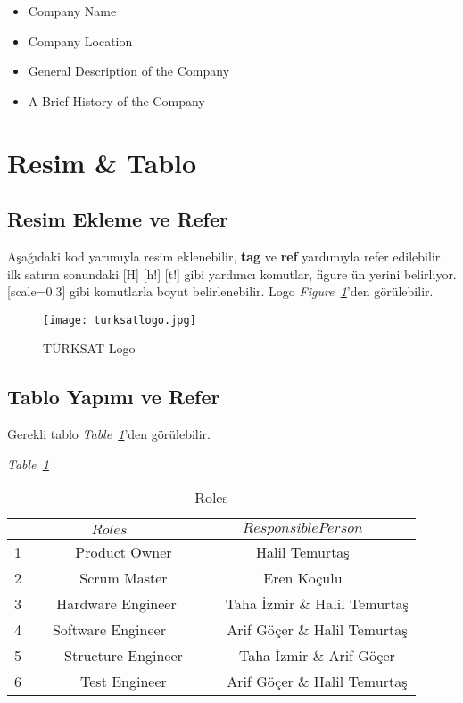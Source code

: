\begin{itemize}
\item Company Name
\item Company Location
\item General Description of the Company
\item A Brief History of the Company
\end{itemize}

\section{Resim \& Tablo}

\subsection{Resim Ekleme ve Refer}
\-
\indent
Aşağıdaki kod yarımıyla resim eklenebilir, \textbf{tag} ve \textbf{ref} yardımıyla refer edilebilir. ilk satırın sonundaki [H] [h!] [t!] gibi yardımcı komutlar, figure ün yerini belirliyor. [scale=0.3] gibi komutlarla boyut belirlenebilir. Logo \textit{Figure~\ref{fig:logo}}'den görülebilir.


\begin{figure}[H]
\centering
\texttt{[image: turksatlogo.jpg]}\\
\caption{\label{fig:logo} TÜRKSAT Logo }
\end{figure}

\subsection{Tablo Yapımı ve Refer}
\- \indent
	Gerekli tablo \textit{Table~\ref{tab:roles}}'den görülebilir.

\textit{Table~\ref{tab:roles}}

\begin{table}[h!]
  \centering
 
    \begin{tabular}{c|c|c}
       &$$Roles$$ & $$Responsible Person$$ \\ \hline
       1 & ~~~~Product Owner & Halil Temurtaş  \\ \hline
       2 & ~~~~Scrum Master  & Eren Koçulu  \\ \hline
       3 & ~~Hardware Engineer & ~~~~Taha İzmir \& Halil Temurtaş \\ \hline
       4 & Software Engineer & ~~~~Arif Göçer \& Halil Temurtaş  \\ \hline
       5 & ~~~~Structure Engineer & ~~~~Taha İzmir \&  Arif Göçer \\ \hline
       6 & ~~~~Test Engineer & ~~~~Arif Göçer \& Halil Temurtaş 
      
  \end{tabular}
  \caption{Roles}
  \label{tab:roles}
\end{table}


